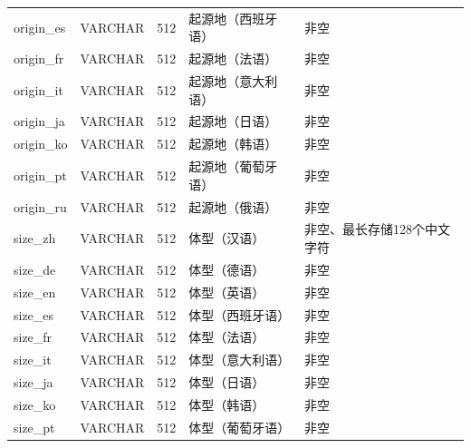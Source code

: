 \begin{longtable}[c]{@{}llrll@{}}
    origin\_es               & VARCHAR       & 512         & 起源地（西班牙语）    & 非空                                   \\
    origin\_fr               & VARCHAR       & 512         & 起源地（法语）      & 非空                                   \\
    origin\_it               & VARCHAR       & 512         & 起源地（意大利语）    & 非空                                   \\
    origin\_ja               & VARCHAR       & 512         & 起源地（日语）      & 非空                                   \\
    origin\_ko               & VARCHAR       & 512         & 起源地（韩语）      & 非空                                   \\
    origin\_pt               & VARCHAR       & 512         & 起源地（葡萄牙语）    & 非空                                   \\
    origin\_ru               & VARCHAR       & 512         & 起源地（俄语）      & 非空                                   \\
    size\_zh                 & VARCHAR       & 512         & 体型（汉语）       & 非空、最长存储128个中文字符                      \\
    size\_de                 & VARCHAR       & 512         & 体型（德语）       & 非空                                   \\
    size\_en                 & VARCHAR       & 512         & 体型（英语）       & 非空                                   \\
    size\_es                 & VARCHAR       & 512         & 体型（西班牙语）     & 非空                                   \\
    size\_fr                 & VARCHAR       & 512         & 体型（法语）       & 非空                                   \\
    size\_it                 & VARCHAR       & 512         & 体型（意大利语）     & 非空                                   \\
    size\_ja                 & VARCHAR       & 512         & 体型（日语）       & 非空                                   \\
    size\_ko                 & VARCHAR       & 512         & 体型（韩语）       & 非空                                   \\
    size\_pt                 & VARCHAR       & 512         & 体型（葡萄牙语）     & 非空                                   \\

\end{longtable}
